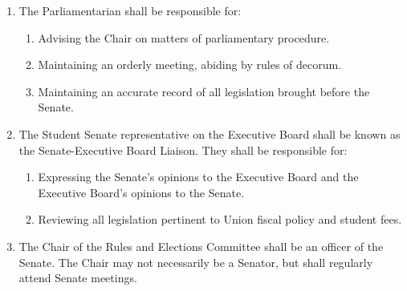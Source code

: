 \begin{enumerate}
\item The Parliamentarian shall be responsible for:
\begin{enumerate}
\item Advising the Chair on matters of parliamentary procedure.
\item Maintaining an orderly meeting, abiding by rules of decorum.
\item Maintaining an accurate record of all legislation brought before the Senate.
\end{enumerate}

\item The Student Senate representative on the Executive Board shall be known as the Senate-Executive Board Liaison. They shall be
responsible for:
\begin{enumerate}
\item Expressing the Senate’s opinions to the Executive Board and the Executive Board’s opinions to the Senate.
\item Reviewing all legislation pertinent to Union fiscal policy and student fees.
\end{enumerate}

\item The Chair of the Rules and Elections Committee shall be an officer of the Senate. The Chair may not necessarily be a Senator,
but shall regularly attend Senate meetings. 

\end{enumerate}